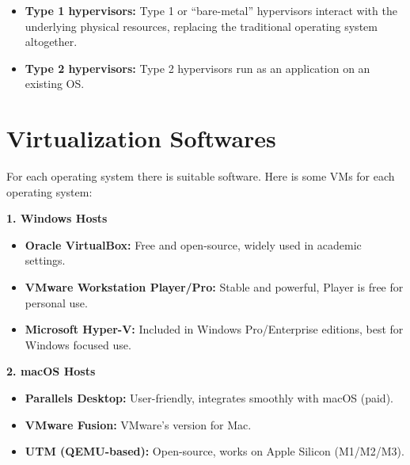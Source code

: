 \begin{itemize}

    \item \textbf{Type 1 hypervisors:} Type 1 or “bare-metal” hypervisors interact with the underlying physical resources, replacing the traditional operating system altogether.\\
    
    \item \textbf{Type 2 hypervisors:} Type 2 hypervisors run as an application on an existing OS.\\

\end{itemize}

\section{Virtualization Softwares}
For each operating system there is suitable software.
Here is some VMs for each operating system:

\textbf{1. Windows Hosts}
\begin{itemize}

    \item \textbf{Oracle VirtualBox:} Free and open-source, widely used in academic settings.

    \item \textbf{VMware Workstation Player/Pro:} Stable and powerful, Player is free for personal use.

    \item \textbf{Microsoft Hyper-V:} Included in Windows Pro/Enterprise editions, best for Windows focused use.

\end{itemize}

\vspace{0.5 cm}

\textbf{2. macOS Hosts}
\begin{itemize}

    \item \textbf{Parallels Desktop:} User-friendly, integrates smoothly with macOS (paid).

    \item \textbf{VMware Fusion:} VMware’s version for Mac.

    \item \textbf{UTM (QEMU-based):} Open-source, works on Apple Silicon (M1/M2/M3).

\end{itemize}

